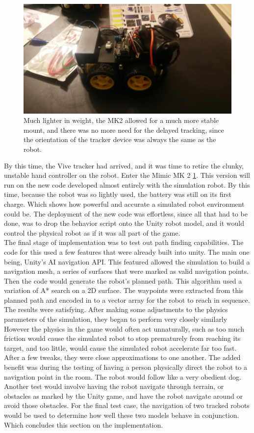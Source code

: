 \documentclass[10pt,a4paper]{article}
\begin{document}
	\begin{figure}
		\centering
		\includegraphics[width=.6\textwidth]{robotv2.jpg}
		\caption{Much lighter in weight, the MK2 allowed for a much more stable mount, and there was no more need for the delayed tracking, since the orientation of the tracker device was always the same as the robot.}
		\label{fig:mimic-mk2}
	\end{figure}
	
	By this time, the Vive tracker had arrived, and it was time to retire the clunky, unstable hand controller on the robot. Enter the Mimic MK 2 \ref{fig:mimic-mk2}. This version will run on the new code developed almost entirely with the simulation robot. By this time, because the robot was so lightly used, the battery was still on its first charge. Which shows how powerful and accurate a simulated robot environment could be. The deployment of the new code was effortless, since all that had to be done, was to drop the behavior script onto the Unity robot model, and it would control the physical robot as if it was all part of the game.
	\\
	The final stage of implementation was to test out path finding capabilities. The code for this used a few features that were already built into unity. The main one being, Unity's AI navigation API. This featured allowed the simulation to build a navigation mesh, a series of surfaces that were marked as valid navigation points. Then the code would generate the robot's planned path. This algorithm used a variation of A* search on a 2D surface. The waypoints were extracted from this planned path and encoded in to a vector array for the robot to reach in sequence. The results were satisfying. After making some adjustments to the physics parameters of the simulation, they began to perform very closely similarly However the physics in the game would often act unnaturally, such as too much friction would cause the simulated robot to stop prematurely from reaching its target, and too little, would cause the simulated robot accelerate far too fast. After a few tweaks, they were close approximations to one another. The added benefit was during the testing of having a person physically direct the robot to a navigation point in the room. The robot would follow like a very obedient dog. Another test would involve having the robot navigate through terrain, or obstacles as marked by the Unity game, and have the robot navigate around or avoid those obstacles. For the final test case, the navigation of two tracked robots would be used to determine how well these two models behave in conjunction. Which concludes this section on the implementation.
	
\end{document}
